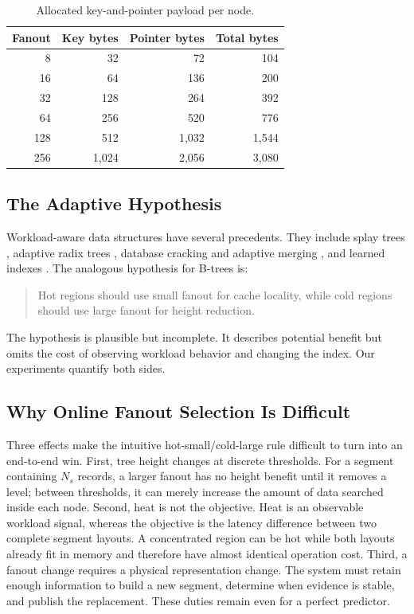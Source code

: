 \documentclass[sigconf,review,anonymous]{acmart}
\begin{document}
\begin{table}[t]
\centering
\caption{Allocated key-and-pointer payload per node.}
\label{tab:node-footprint}
\begin{tabular}{rrrr}
\toprule
Fanout & Key bytes & Pointer bytes & Total bytes \\
\midrule
8   & 32   & 72   & 104 \\
16  & 64   & 136  & 200 \\
32  & 128  & 264  & 392 \\
64  & 256  & 520  & 776 \\
128 & 512  & 1,032 & 1,544 \\
256 & 1,024 & 2,056 & 3,080 \\
\bottomrule
\end{tabular}
\end{table}

\subsection{The Adaptive Hypothesis}

Workload-aware data structures have several precedents.  They include splay
trees \cite{sleator1985self}, adaptive radix trees \cite{leis2013adaptive},
database cracking and adaptive merging
\cite{idreos2007database,idreos2011adaptive}, and learned indexes
\cite{kraska2018case,ding2020alex,galakatos2019fiting}.  The analogous
hypothesis for B-trees is:

\begin{quote}
Hot regions should use small fanout for cache locality, while cold regions
should use large fanout for height reduction.
\end{quote}

The hypothesis is plausible but incomplete.  It describes potential benefit
but omits the cost of observing workload behavior and changing the index.  Our
experiments quantify both sides.

\subsection{Why Online Fanout Selection Is Difficult}

Three effects make the intuitive hot-small/cold-large rule difficult to turn
into an end-to-end win.  First, tree height changes at discrete thresholds.
For a segment containing \(N_s\) records, a larger fanout has no height benefit
until it removes a level; between thresholds, it can merely increase the
amount of data searched inside each node.  Second, heat is not the objective.
Heat is an observable workload signal, whereas the objective is the latency
difference between two complete segment layouts.  A concentrated region can
be hot while both layouts already fit in memory and therefore have almost
identical operation cost.  Third, a fanout change requires a physical
representation change.  The system must retain enough information to build a
new segment, determine when evidence is stable, and publish the replacement.
These duties remain even for a perfect predictor.
\end{document}
